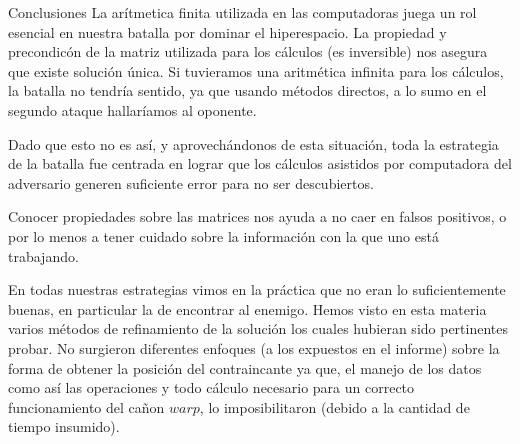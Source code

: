 \begin{section}{Conclusiones}
	La arítmetica finita utilizada en las computadoras juega un rol esencial en nuestra batalla por dominar el hiperespacio. La propiedad y precondicón de la matriz utilizada para los cálculos (es inversible) nos asegura que existe solución única. Si tuvieramos una aritmética infinita para los cálculos, la batalla no tendría sentido, ya que usando métodos directos, a lo sumo en el segundo ataque hallaríamos al oponente.
	 
	Dado que esto no es así, y aprovechándonos de esta situación, toda la estrategia de la batalla fue centrada en lograr que los cálculos asistidos por computadora del adversario generen suficiente error para no ser descubiertos.
	
	Conocer propiedades sobre las matrices nos ayuda a no caer en falsos positivos, o por lo menos a tener cuidado sobre la información con la que uno está trabajando.
	
	En todas nuestras estrategias vimos en la práctica que no eran lo suficientemente buenas, en particular la de encontrar al enemigo. Hemos visto en esta materia varios métodos de refinamiento de la solución los cuales hubieran sido pertinentes probar. No surgieron diferentes enfoques (a los expuestos en el informe) sobre la forma de obtener la posición del contraincante ya que, el manejo de los datos como así las operaciones y todo cálculo necesario para un correcto funcionamiento del cañon $warp$, lo imposibilitaron (debido a la cantidad de tiempo insumido).
\end{section}
